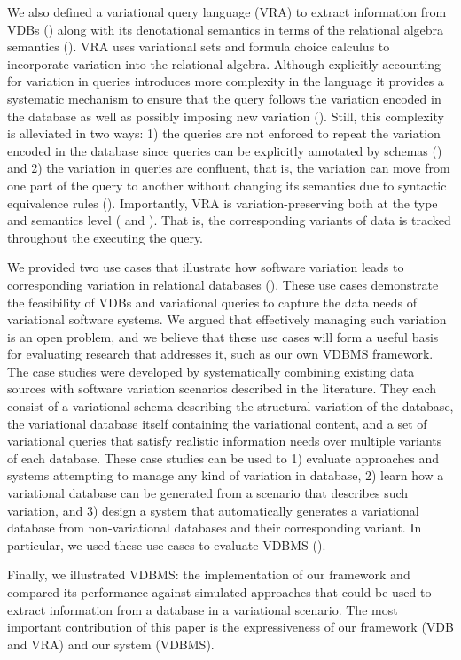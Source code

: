 We also defined a variational query language (VRA) to extract information from VDBs
() along with its denotational semantics in terms of the relational algebra 
semantics (). 
%
VRA uses variational sets and formula choice calculus to incorporate
variation into the relational algebra. Although explicitly accounting for variation
in queries introduces more complexity in the language it provides a systematic
mechanism to ensure that the query follows the variation encoded in the database
as well as possibly imposing new variation (). Still, this complexity
is alleviated in two ways: 1) the queries are not enforced to repeat the variation encoded in the 
database since queries can be explicitly annotated by schemas ()
and 2) the variation in queries are confluent, that is, the variation can move from one 
part of the query to another without changing its semantics due to syntactic equivalence
rules (). 
%
Importantly, VRA is variation-preserving both at the type and semantics level
( and ). 
That is, the corresponding variants of data is tracked throughout the executing 
the query.

We provided two use cases that illustrate how software variation leads to
corresponding variation in relational databases (). 
These use cases demonstrate
the feasibility of VDBs and variational queries to capture the data needs of variational
software systems.
%
We argued that effectively managing such variation is an open problem, and we
believe that these use cases will form a useful basis for evaluating
research that addresses it, such as our own VDBMS framework.
%
The case studies were developed by systematically combining existing data
sources with software variation scenarios described in the literature. They
each consist of a variational schema describing the structural variation of
the database, the variational database itself containing the variational
content, and a set of variational queries that satisfy realistic information
needs over multiple variants of each database.
% 
These case studies can be used to 1) evaluate approaches and systems
 attempting to manage any kind of variation in database, 2) learn how a
 variational database can be generated from a scenario that describes such
 variation, and 3) design a system that automatically generates a variational
 database from non-variational databases and their corresponding variant. In
 particular, we used these use cases to evaluate VDBMS (). 


Finally, we illustrated VDBMS: the implementation of our framework
and compared its performance against simulated approaches that
could be used to extract information from a database in a variational
scenario.
The most important contribution of this paper is the expressiveness of
our framework (VDB and VRA) and our system (VDBMS).


